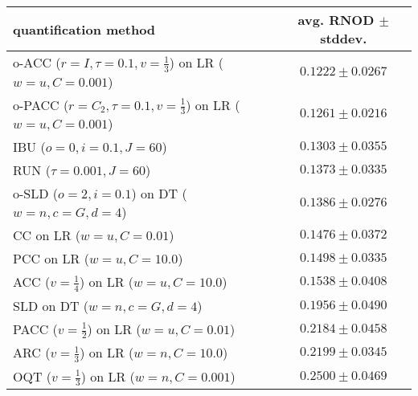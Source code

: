 \begin{tabular}{lc}
  \toprule
  quantification method & avg. RNOD $\pm$ stddev. \\
  \midrule
  o-ACC ($r=I, \tau=0.1, v=\frac{1}{3}$) on LR ($w=u, C=0.001$) & $\mathbf{0.1222 \pm 0.0267}$ \\
  o-PACC ($r=C_2, \tau=0.1, v=\frac{1}{3}$) on LR ($w=u, C=0.001$) & $0.1261 \pm 0.0216$ \\
  IBU ($o=0, i=0.1, J=60$) & $0.1303 \pm 0.0355$ \\
  RUN ($\tau=0.001, J=60$) & $0.1373 \pm 0.0335$ \\
  o-SLD ($o=2, i=0.1$) on DT ($w=n, c=G, d=4$) & $0.1386 \pm 0.0276$ \\
  CC on LR ($w=u, C=0.01$) & $0.1476 \pm 0.0372$ \\
  PCC on LR ($w=u, C=10.0$) & $0.1498 \pm 0.0335$ \\
  ACC ($v=\frac{1}{4}$) on LR ($w=u, C=10.0$) & $0.1538 \pm 0.0408$ \\
  SLD on DT ($w=n, c=G, d=4$) & $0.1956 \pm 0.0490$ \\
  PACC ($v=\frac{1}{2}$) on LR ($w=u, C=0.01$) & $0.2184 \pm 0.0458$ \\
  ARC ($v=\frac{1}{3}$) on LR ($w=n, C=10.0$) & $0.2199 \pm 0.0345$ \\
  OQT ($v=\frac{1}{3}$) on LR ($w=n, C=0.001$) & $0.2500 \pm 0.0469$ \\
  \bottomrule
\end{tabular}
